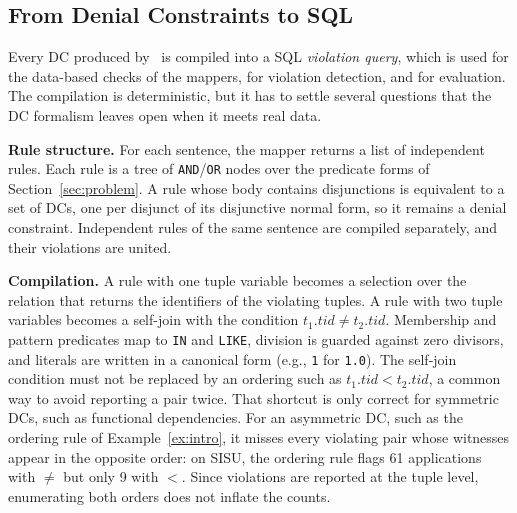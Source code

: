

\subsection{From Denial Constraints to SQL}
\label{sec:mapper:sql}

Every DC produced by \system\ is compiled into a SQL \emph{violation query}, which is used for the data-based checks of the mappers, for violation detection, and for evaluation. The compilation is deterministic, but it has to settle several questions that the DC formalism leaves open when it meets real data.

\smallskip\noindent\textbf{Rule structure.}
For each sentence, the mapper returns a list of independent rules. Each rule is a tree of \texttt{AND}/\texttt{OR} nodes over the predicate forms of Section~\ref{sec:problem}. A rule whose body contains disjunctions is equivalent to a set of DCs, one per disjunct of its disjunctive normal form, so it remains a denial constraint. Independent rules of the same sentence are compiled separately, and their violations are united.

\smallskip\noindent\textbf{Compilation.}
A rule with one tuple variable becomes a selection over the relation that returns the identifiers of the violating tuples. A rule with two tuple variables becomes a self-join with the condition $t_1.\mathit{tid} \neq t_2.\mathit{tid}$. Membership and pattern predicates map to \texttt{IN} and \texttt{LIKE}, division is guarded against zero divisors, and literals are written in a canonical form (e.g., \texttt{1} for \texttt{1.0}). The self-join condition must not be replaced by an ordering such as $t_1.\mathit{tid} < t_2.\mathit{tid}$, a common way to avoid reporting a pair twice. That shortcut is only correct for symmetric DCs, such as functional dependencies. For an asymmetric DC, such as the ordering rule of Example~\ref{ex:intro}, it misses every violating pair whose witnesses appear in the opposite order: on SISU, the ordering rule flags 61 applications with $\neq$ but only 9 with $<$. Since violations are reported at the tuple level, enumerating both orders does not inflate the counts.

